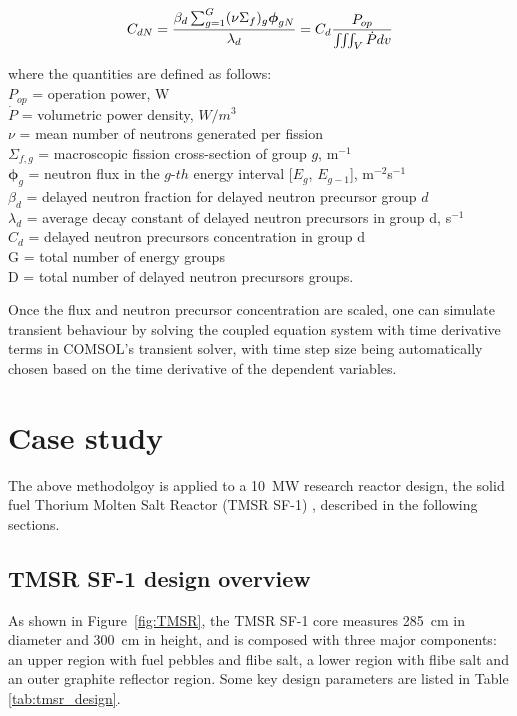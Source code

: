 \documentclass{elsarticle}
\newcommand{\flux}{{\ensuremath{\boldsymbol{\phi}}} }
\begin{document}
\begin{equation}
      C_{dN} = \frac{\beta_d \sum_{g=1}^G (\nu\Sigma_f)_g \flux_{gN}}{\lambda_d}\\
      = C_d\frac{P_{op}}{\iiint_V{\dot{P}dv}}
\end{equation}

where the quantities are defined as follows:\\
$P_{op}$ = operation power, W\\
$\dot{P}$ = volumetric power density, $W/m^3$\\
$\nu$ = mean number of neutrons generated per fission\\
$\Sigma_{f,g}$ = macroscopic fission cross-section of group $g$, m$^{-1}$\\
  $\flux_{g}$ = neutron flux in the $g$-$th$ energy interval [$E_g$, $E_{g-1}$], m$^{-2}$s$^{-1}$
\\
  $\beta_d$ = delayed neutron fraction for delayed neutron precursor group $d$
\\
  $\lambda_d$ = average decay constant of delayed neutron precursors in group d, s$^{-1}$
\\
  $C_d$ = delayed neutron precursors concentration in group d
 \\
 G = total number of energy groups\\
 D = total number of delayed neutron precursors groups.


Once the flux and neutron precursor concentration are scaled, one can simulate transient behaviour by solving the coupled equation system with time derivative terms in COMSOL's transient solver, with time step size being automatically chosen based on the time derivative of the dependent variables.



\section{Case study}
\label{sec:res}
The above methodolgoy is applied to a 10~MW research reactor design, the solid fuel Thorium Molten Salt Reactor (TMSR SF-1) \cite{wang2014a}, described in the following sections.

\subsection{TMSR SF-1 design overview}
As shown in Figure~\ref{fig:TMSR}, the TMSR SF-1 core measures 285~cm in diameter and 300~cm in height, and is composed with three major components: an upper region with fuel pebbles and flibe salt, a lower region with flibe salt and an outer graphite reflector region. Some key design parameters are listed in Table \ref{tab:tmsr_design}.
\end{document}
